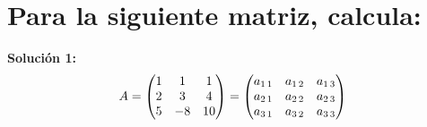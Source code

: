\section{Para la siguiente matriz, calcula: }
\textbf{Soluci\'on 1:}\\
\[A  = \begin{pmatrix}
	1 & 1 & 1 \\
	2 & 3 & 4 \\
	5 & -8 & 10\end{pmatrix}= \begin{pmatrix}
	a_{1\hspace{0.5mm}1} & a_{1\hspace{0.5mm}2} & a_{1\hspace{0.5mm}3} \\
	a_{2\hspace{0.5mm}1} & a_{2\hspace{0.5mm}2} & a_{2\hspace{0.5mm}3} \\
	a_{3\hspace{0.5mm}1} & a_{3\hspace{0.5mm}2} & a_{3\hspace{0.5mm}3} \end{pmatrix}\]
